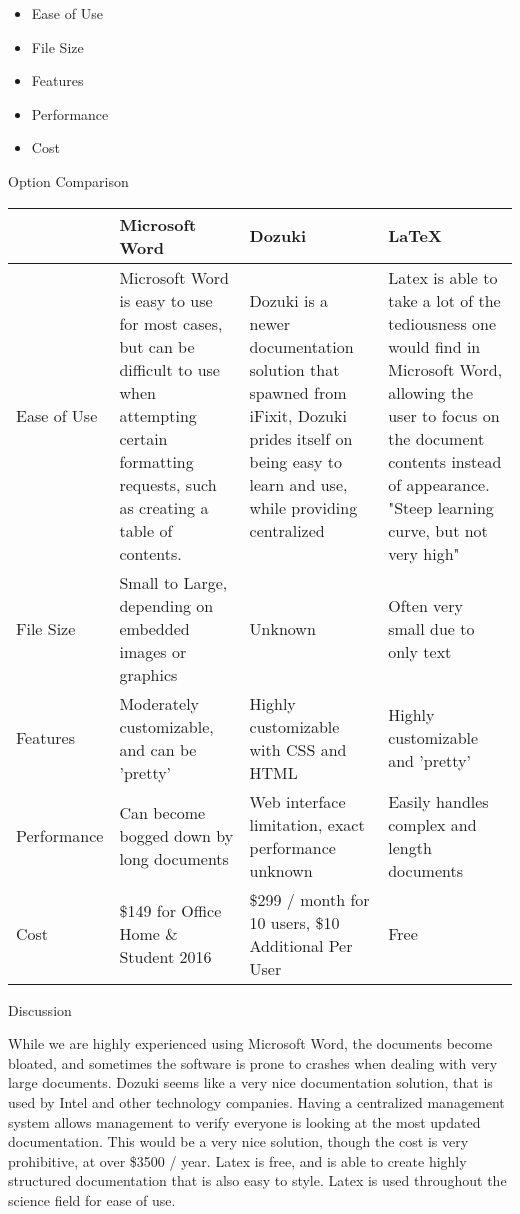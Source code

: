 \documentclass[letterpaper, 10pt, draftclsnofoot, compsoc, onecolumn]{IEEEtran}
\begin{document}
{{\begin{itemize}
\item Ease of Use
\item File Size
\item Features
\item Performance
\item Cost
\end{itemize}

 \par}


\newpage
{\noindent Option Comparison \par}
\tablehead{}
\begin{supertabular}{|p{2cm}|p{4cm}|p{4cm}|p{4cm}|}
\hline  & Microsoft Word & Dozuki & LaTeX\\ \hline
Ease of Use & Microsoft Word is easy to use for most cases, but can be difficult to use when attempting certain formatting requests, such as creating a table of contents. & Dozuki is a newer documentation solution that spawned from iFixit, Dozuki prides itself on being easy to learn and use, while providing centralized   & Latex is able to take a lot of the tediousness one would find in Microsoft Word, allowing the user to focus on the document contents instead of appearance. "Steep learning curve, but not very high" \cite{McGrath} \\ \hline
File Size & Small to Large, depending on embedded images or graphics & Unknown & Often very small due to only text \\ \hline
Features & Moderately customizable, and can be 'pretty' & Highly customizable with CSS and HTML & Highly customizable and 'pretty' \\ \hline
Performance & Can become bogged down by long documents & Web interface limitation, exact performance unknown & Easily handles complex and length documents  \\ \hline
Cost & \$149 for Office Home \& Student 2016 & \$299 / month for 10 users, \$10 Additional Per User & Free \\ \hline

\end{supertabular}

\newpage
{\noindent Discussion \par}
{\noindent While we are highly experienced using Microsoft Word, the documents become bloated, and sometimes the software is prone to crashes when dealing with very large documents. Dozuki seems like a very nice documentation solution, that is used by Intel and other technology companies. Having a centralized management system allows management to verify everyone is looking at the most updated documentation. This would be a very nice solution, though the cost is very prohibitive, at over \$3500 / year. Latex is free, and is able to create highly structured documentation that is also easy to style. Latex is used throughout the science field for ease of use.\par}

}
\end{document}
